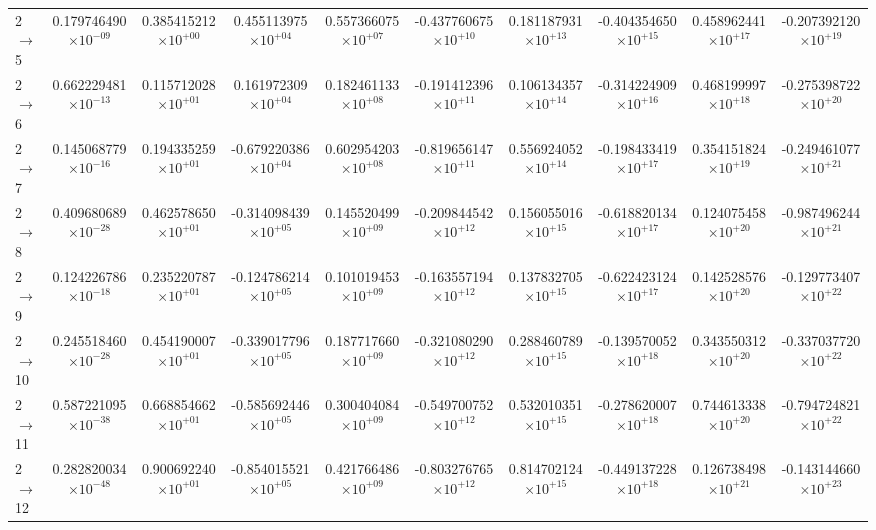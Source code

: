 \documentclass[reviewcopy]{elsarticle}
\begin{document}
\begin{landscape}
\begin{longtable}{lccccccccc}
2 $\to$ 5  & 0.179746490$\times10^{-09}$  & 0.385415212$\times10^{+00}$  & 0.455113975$\times10^{+04}$  & 0.557366075$\times10^{+07}$  & -0.437760675$\times10^{+10}$  & 0.181187931$\times10^{+13}$  & -0.404354650$\times10^{+15}$  & 0.458962441$\times10^{+17}$  & -0.207392120$\times10^{+19}$ \\
2 $\to$ 6  & 0.662229481$\times10^{-13}$  & 0.115712028$\times10^{+01}$  & 0.161972309$\times10^{+04}$  & 0.182461133$\times10^{+08}$  & -0.191412396$\times10^{+11}$  & 0.106134357$\times10^{+14}$  & -0.314224909$\times10^{+16}$  & 0.468199997$\times10^{+18}$  & -0.275398722$\times10^{+20}$ \\
2 $\to$ 7  & 0.145068779$\times10^{-16}$  & 0.194335259$\times10^{+01}$  & -0.679220386$\times10^{+04}$  & 0.602954203$\times10^{+08}$  & -0.819656147$\times10^{+11}$  & 0.556924052$\times10^{+14}$  & -0.198433419$\times10^{+17}$  & 0.354151824$\times10^{+19}$  & -0.249461077$\times10^{+21}$ \\
2 $\to$ 8  & 0.409680689$\times10^{-28}$  & 0.462578650$\times10^{+01}$  & -0.314098439$\times10^{+05}$  & 0.145520499$\times10^{+09}$  & -0.209844542$\times10^{+12}$  & 0.156055016$\times10^{+15}$  & -0.618820134$\times10^{+17}$  & 0.124075458$\times10^{+20}$  & -0.987496244$\times10^{+21}$ \\
2 $\to$ 9  & 0.124226786$\times10^{-18}$  & 0.235220787$\times10^{+01}$  & -0.124786214$\times10^{+05}$  & 0.101019453$\times10^{+09}$  & -0.163557194$\times10^{+12}$  & 0.137832705$\times10^{+15}$  & -0.622423124$\times10^{+17}$  & 0.142528576$\times10^{+20}$  & -0.129773407$\times10^{+22}$ \\
2 $\to$ 10  & 0.245518460$\times10^{-28}$  & 0.454190007$\times10^{+01}$  & -0.339017796$\times10^{+05}$  & 0.187717660$\times10^{+09}$  & -0.321080290$\times10^{+12}$  & 0.288460789$\times10^{+15}$  & -0.139570052$\times10^{+18}$  & 0.343550312$\times10^{+20}$  & -0.337037720$\times10^{+22}$ \\
2 $\to$ 11  & 0.587221095$\times10^{-38}$  & 0.668854662$\times10^{+01}$  & -0.585692446$\times10^{+05}$  & 0.300404084$\times10^{+09}$  & -0.549700752$\times10^{+12}$  & 0.532010351$\times10^{+15}$  & -0.278620007$\times10^{+18}$  & 0.744613338$\times10^{+20}$  & -0.794724821$\times10^{+22}$ \\
2 $\to$ 12  & 0.282820034$\times10^{-48}$  & 0.900692240$\times10^{+01}$  & -0.854015521$\times10^{+05}$  & 0.421766486$\times10^{+09}$  & -0.803276765$\times10^{+12}$  & 0.814702124$\times10^{+15}$  & -0.449137228$\times10^{+18}$  & 0.126738498$\times10^{+21}$  & -0.143144660$\times10^{+23}$ \\

\end{longtable}
\end{landscape}
\end{document}
